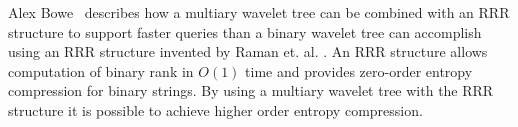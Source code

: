 Alex Bowe~ describes how a multiary wavelet tree can be combined with an RRR structure to support faster queries than a binary wavelet tree can accomplish using an RRR structure invented by Raman et. al. .
An RRR structure allows computation of binary rank in $O(1)$ time and provides zero-order entropy compression for binary strings.
By using a multiary wavelet tree with the RRR structure it is possible to achieve higher order entropy compression.




